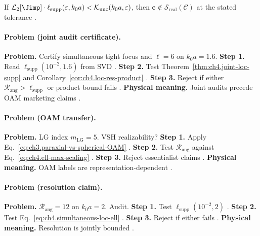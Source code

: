 \begin{corollary}
\label{cor:ch4.loc-res-product}
If \(\mathcal{L}_{2}[\Jimp]\cdot\ell_{\mathrm{supp}}(\varepsilon,k_{0}a)<\mathcal{K}_{\mathrm{unc}}(k_{0}a,\varepsilon)\), then
\(\mathbf{c}\notin\mathcal{S}_{\mathrm{real}}(\mathcal{C})\) at the stated tolerance \cite{hansen1988,jackson1999,stratton1941,harrington2001,devaney2004}.
\end{corollary}

\paragraph{Problem (joint audit certificate).}
\textbf{Problem.} Certify simultaneous tight focus and \(\ell=6\) on \(k_{0}a=1.6\).
\textbf{Step 1.} Read \(\ell_{\mathrm{supp}}(10^{-2},1.6)\) from SVD \cite{hansen1988,harrington2001}.
\textbf{Step 2.} Test Theorem~\ref{thm:ch4.joint-loc-supp} and Corollary~\ref{cor:ch4.loc-res-product} \cite{jackson1999,stratton1941}.
\textbf{Step 3.} Reject if either \(\mathcal{R}_{\mathrm{ang}}>\ell_{\mathrm{supp}}\) or product bound fails \cite{devaney2004}.
\textbf{Physical meaning.} Joint audits precede OAM marketing claims \cite{harrington2001,hansen1988}.

\paragraph{Problem (OAM transfer).}
\textbf{Problem.} LG index \(m_{\mathrm{LG}}=5\). VSH realizability?
\textbf{Step 1.} Apply Eq.~\eqref{eq:ch3.paraxial-vs-spherical-OAM} \cite{harrington2001}.
\textbf{Step 2.} Test \(\mathcal{R}_{\mathrm{ang}}\) against Eq.~\eqref{eq:ch4.ell-max-scaling} \cite{hansen1988}.
\textbf{Step 3.} Reject essentialist claims \cite{stratton1941,belinfante1940}.
\textbf{Physical meaning.} OAM labels are representation-dependent \cite{harrington2001}.

\paragraph{Problem (resolution claim).}
\textbf{Problem.} \(\mathcal{R}_{\mathrm{ang}}=12\) on \(k_{0}a=2\). Audit.
\textbf{Step 1.} Test \(\ell_{\mathrm{supp}}(10^{-2},2)\) \cite{hansen1988,harrington2001}.
\textbf{Step 2.} Test Eq.~\eqref{eq:ch4.simultaneous-loc-ell} \cite{jackson1999}.
\textbf{Step 3.} Reject if either fails \cite{devaney2004,stratton1941}.
\textbf{Physical meaning.} Resolution is jointly bounded \cite{hansen1988}.

